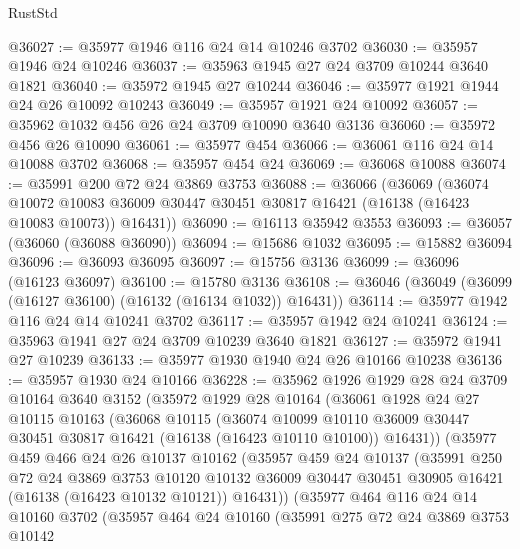 \begin{lexlean}{RustStd}
\begin{coremodule}
@36027 := @35977 @1946 @116 @24 @14 @10246 @3702
@36030 := @35957 @1946 @24 @10246
@36037 := @35963 @1945 @27 @24 @3709 @10244 @3640 @1821
@36040 := @35972 @1945 @27 @10244
@36046 := @35977 @1921 @1944 @24 @26 @10092 @10243
@36049 := @35957 @1921 @24 @10092
@36057 := @35962 @1032 @456 @26 @24 @3709 @10090 @3640 @3136
@36060 := @35972 @456 @26 @10090
@36061 := @35977 @454
@36066 := @36061 @116 @24 @14 @10088 @3702
@36068 := @35957 @454 @24
@36069 := @36068 @10088
@36074 := @35991 @200 @72 @24 @3869 @3753
@36088 := @36066
    (@36069
      (@36074
        @10072
        @10083
        @36009
        @30447
        @30451
        @30817
        @16421
        (@16138 (@16423 @10083 @10073))
        @16431))
@36090 := @16113 @35942 @3553
@36093 := @36057 (@36060 (@36088 @36090))
@36094 := @15686 @1032
@36095 := @15882 @36094
@36096 := @36093 @36095
@36097 := @15756 @3136
@36099 := @36096 (@16123 @36097)
@36100 := @15780 @3136
@36108 := @36046 (@36049 (@36099 (@16127 @36100) (@16132 (@16134 @1032)) @16431))
@36114 := @35977 @1942 @116 @24 @14 @10241 @3702
@36117 := @35957 @1942 @24 @10241
@36124 := @35963 @1941 @27 @24 @3709 @10239 @3640 @1821
@36127 := @35972 @1941 @27 @10239
@36133 := @35977 @1930 @1940 @24 @26 @10166 @10238
@36136 := @35957 @1930 @24 @10166
@36228 := @35962
    @1926
    @1929
    @28
    @24
    @3709
    @10164
    @3640
    @3152
    (@35972
      @1929
      @28
      @10164
      (@36061
        @1928
        @24
        @27
        @10115
        @10163
        (@36068
          @10115
          (@36074
            @10099
            @10110
            @36009
            @30447
            @30451
            @30817
            @16421
            (@16138 (@16423 @10110 @10100))
            @16431))
        (@35977
          @459
          @466
          @24
          @26
          @10137
          @10162
          (@35957
            @459
            @24
            @10137
            (@35991
              @250
              @72
              @24
              @3869
              @3753
              @10120
              @10132
              @36009
              @30447
              @30451
              @30905
              @16421
              (@16138 (@16423 @10132 @10121))
              @16431))
          (@35977
            @464
            @116
            @24
            @14
            @10160
            @3702
            (@35957
              @464
              @24
              @10160
              (@35991
                @275
                @72
                @24
                @3869
                @3753
                @10142

\end{coremodule}
\end{lexlean}

